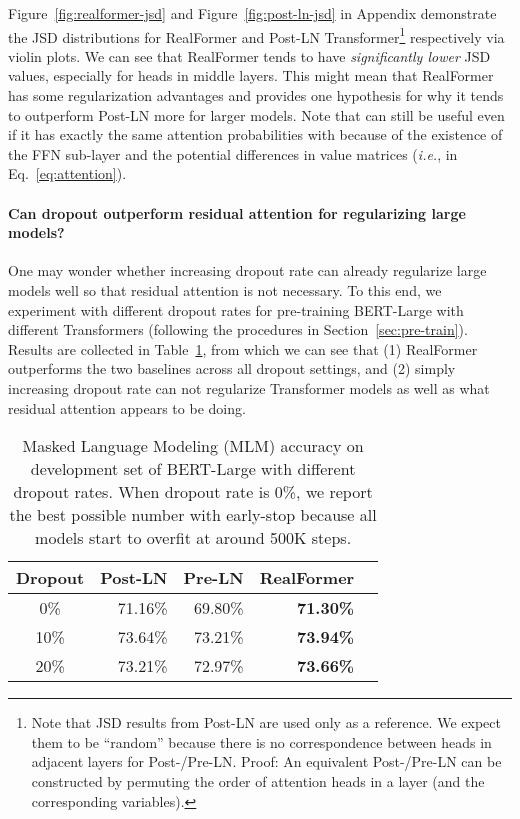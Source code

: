 \documentclass[11pt,a4paper]{article}
\begin{document}
Figure~\ref{fig:realformer-jsd} and Figure~\ref{fig:post-ln-jsd} in Appendix demonstrate the JSD distributions for RealFormer and Post-LN Transformer\footnote{Note that JSD results from Post-LN are used only as a reference. We expect them to be ``random'' because there is no correspondence between heads in adjacent layers for Post-/Pre-LN. Proof: An equivalent Post-/Pre-LN can be constructed by permuting the order of attention heads in a layer (and the corresponding variables).} respectively via violin plots. We can see that RealFormer tends to have \emph{significantly lower} JSD values, especially for heads in middle layers. This might mean that RealFormer has some regularization advantages and provides one hypothesis for why it tends to outperform Post-LN more for larger models. Note that  can still be useful even if it has exactly the same attention probabilities with  because of the existence of the FFN sub-layer and the potential differences in value matrices (\emph{i.e.},  in Eq.~\ref{eq:attention}).


\paragraph{Can dropout outperform residual attention for regularizing large models?}
One may wonder whether increasing dropout rate can already regularize large models well so that residual attention is not necessary. To this end, we experiment with different dropout rates for pre-training BERT-Large with different Transformers (following the procedures in Section~\ref{sec:pre-train}). Results are collected in Table~\ref{table:dropout}, from which we can see that (1) RealFormer outperforms the two baselines across all dropout settings, and (2) simply increasing dropout rate can not regularize Transformer models as well as what residual attention appears to be doing.


\begin{table}
\centering
\begin{tabular}{crrrr}
\hline \textbf{Dropout} & \textbf{Post-LN} & \textbf{Pre-LN} & \textbf{RealFormer} \\ \hline
0\%   & 71.16\%  & 69.80\%  & \textbf{71.30\%}  \\
10\%  & 73.64\%  & 73.21\%   & \textbf{73.94\%}  \\
20\%  & 73.21\%  & 72.97\%   & \textbf{73.66\%}  \\
\hline
\end{tabular}
\caption{\label{table:dropout} Masked Language Modeling (MLM) accuracy on development set of BERT-Large with different dropout rates. When dropout rate is 0\%, we report the best possible number with early-stop because all models start to overfit at around 500K steps.}
\end{table}
\end{document}
